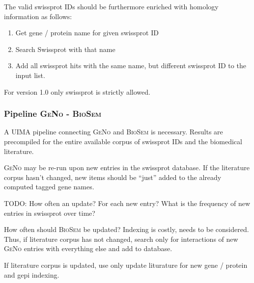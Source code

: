 \documentclass[a4paper,10pt]{article}
\begin{document}
The valid swissprot IDs should be furthermore enriched with homology information as follows:
\begin{enumerate}
 \item Get gene / protein name for given swissprot ID
 \item Search Swissprot with that name
 \item Add all swissprot hits with the same name, but different swissprot ID to the input list.
\end{enumerate}

For version 1.0 only swissprot is strictly allowed.

\subsubsection{Pipeline \textsc{GeNo} - \textsc{BioSem}}

A UIMA pipeline connecting \textsc{GeNo} and \textsc{BioSem} is necessary.
Results are precompiled for the entire available corpus of swissprot IDs and the biomedical literature.

\textsc{GeNo} may be re-run upon new entries in the swissprot database. If the literature corpus hasn't changed, new items should be ``just'' added to the already computed tagged gene names. 

TODO: How often an update? For each new entry? What is the frequency of new entries in swissprot over time?

How often should \textsc{BioSem} be updated? Indexing is costly, needs to be considered. Thus, if literature corpus has not changed, search only for interactions of new \textsc{GeNo} entries with everything else and add to database.

If literature corpus is updated, use only update liturature for new gene / protein and gepi indexing.
\end{document}

